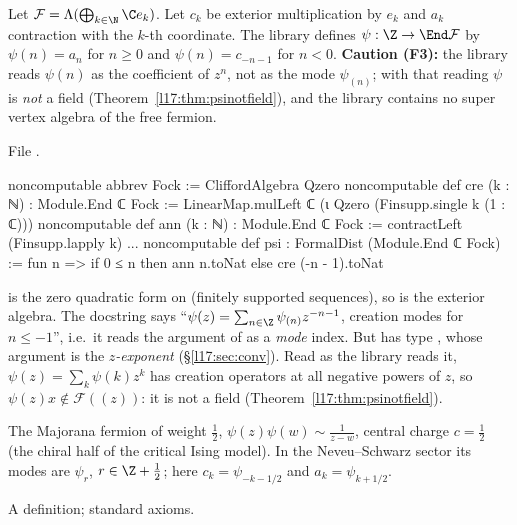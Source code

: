 \begin{definition}\label{l17:def:psi}
Let $\mathcal F=\Lambda(\bigoplus_{k\in\N}\C e_k)$. Let $c_k$ be exterior multiplication by $e_k$ and
$a_k$ contraction with the $k$-th coordinate. The library defines $\psi:\Z\to\End\mathcal F$ by
$\psi(n)=a_n$ for $n\ge0$ and $\psi(n)=c_{-n-1}$ for $n<0$. \textbf{Caution (F3):} the library
reads $\psi(n)$ as the coefficient of $z^{n}$, not as the mode $\psi_{(n)}$; with that reading $\psi$ is
\emph{not} a field (Theorem~\ref{l17:thm:psinotfield}), and the library contains no super vertex
algebra of the free fermion.
\end{definition}
\noindent File .
\begin{leancode}
noncomputable abbrev Fock := CliffordAlgebra Qzero
noncomputable def cre (k : ℕ) : Module.End ℂ Fock :=
  LinearMap.mulLeft ℂ (ι Qzero (Finsupp.single k (1 : ℂ)))
noncomputable def ann (k : ℕ) : Module.End ℂ Fock := contractLeft (Finsupp.lapply k)
...
noncomputable def psi : FormalDist (Module.End ℂ Fock) :=
  fun n => if 0 ≤ n then ann n.toNat else cre (-n - 1).toNat
\end{leancode}
\begin{dictionary}
 is the zero quadratic form on  (finitely supported sequences),
so  is the exterior algebra. The docstring says ``$\psi(z)=\sum_{n\in\Z}\psi_{(n)}z^{-n-1}$,
creation modes for $n\le-1$'', i.e.\ it reads the argument of  as a \emph{mode} index. But
 has type , whose argument is the \emph{$z$-exponent}
(§\ref{l17:sec:conv}). Read as the library reads it, $\psi(z)=\sum_k\psi(k)z^k$ has creation
operators at all negative powers of $z$, so $\psi(z)x\notin\mathcal F((z))$: it is not a field
(Theorem~\ref{l17:thm:psinotfield}).
\end{dictionary}
\begin{physics}
The Majorana fermion of weight $\frac12$, $\psi(z)\psi(w)\sim\frac1{z-w}$, central charge
$c=\frac12$ (the chiral half of the critical Ising model). In the Neveu--Schwarz sector its modes are
$\psi_r$, $r\in\Z+\frac12$; here $c_k=\psi_{-k-1/2}$ and $a_k=\psi_{k+1/2}$.
\end{physics}
\begin{status}
A definition; standard axioms.
\end{status}

